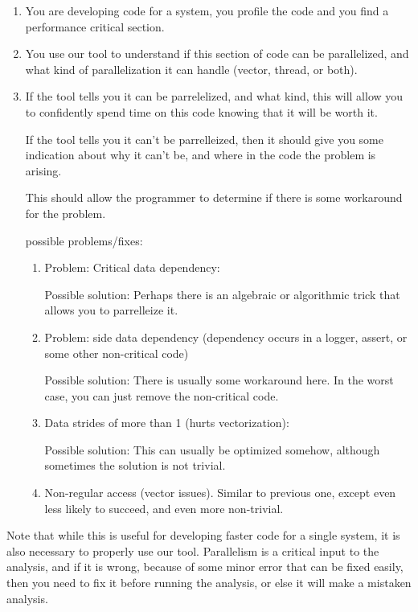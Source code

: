 \documentclass[12pt,twoside]{reedthesis}
\begin{document}
		\begin{enumerate}
			\item
			You are developing code for a system, you profile the code and you find a performance critical section.
			\item You use our tool to understand if this section of code can be parallelized, and what kind of parallelization it can handle (vector, thread, or both).

			\item If the tool tells you it can be parrelelized, and what kind, this will allow you to confidently spend time on this code knowing that it will be worth it.

			If the tool tells you it can't be parrelleized, then it should give you some indication about why it can't be, and where in the code the problem is arising.

			This should allow the programmer to determine if there is some workaround for the problem.

			possible problems/fixes:

			\begin{enumerate}
				\item Problem: Critical data dependency:

				Possible solution: Perhaps there is an algebraic or algorithmic trick that allows you to parrelleize it.

				\item Problem: side data dependency (dependency occurs in a logger, assert, or some other non-critical code)

				Possible solution: There is usually some workaround here. In the worst case, you can just remove the non-critical code.

				\item Data strides of more than 1 (hurts vectorization):

				Possible solution: This can usually be optimized somehow, although sometimes the solution is not trivial.

				\item Non-regular access (vector issues). Similar to previous one, except even less likely to succeed, and even more non-trivial.
			\end{enumerate}

		\end{enumerate}

		Note that while this is useful for developing faster code for a single system, it is also necessary to properly use our tool. Parallelism is a critical input to the analysis, and if it is wrong, because of some minor error that can be fixed easily, then you need to fix it before running the analysis, or else it will make a mistaken analysis.
\end{document}
